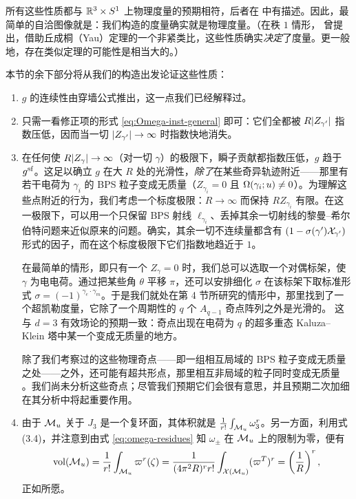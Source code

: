 所有这些性质都与 $\IR^3 \times S^1$ 上物理度量的预期相符，后者在 \cite{Seiberg:1996nz} 中有描述。因此，最简单的自洽图像就是：我们构造的度量确实就是物理度量。（在秩 $1$ 情形，\cite{Seiberg:1996nz} 曾提出，借助丘成桐（Yau）定理的一个非紧类比，这些性质确实\emph{决定}了度量。更一般地，存在类似定理的可能性是相当大的。）

本节的余下部分将从我们的构造出发论证这些性质：
\begin{enumerate}
\item $g$ 的连续性由穿墙公式推出，这一点我们已经解释过。

\item 只需一看修正项的形式 \eqref{eq:Omega-inst-general} 即可：它们全都被 $R \abs{Z_{\gamma'}}$ 指数压低，因而当一切 $\abs{Z_{\gamma'}} \to \infty$ 时指数快地消失。

\item 在任何使 $R \abs{Z_\gamma} \to \infty$（对一切 $\gamma$）的极限下，瞬子贡献都指数压低，$g$ 趋于 $g^\sf$。这足以确立 $g$ 在大 $R$ 处的光滑性，\emph{除了}在某些奇异轨迹附近——那里有若干电荷为 $\gamma_i$ 的 BPS 粒子变成无质量（$Z_{\gamma_i} = 0$ 且 $\degen(\gamma_i;u) \neq 0$）。为理解这些点附近的行为，我们考虑一个标度极限：$R \to \infty$ 而保持 $R Z_{\gamma_i}$ 有限。在这一极限下，可以用一个只保留 BPS 射线 $\ell_{\gamma_i}$、丢掉其余一切射线的黎曼--希尔伯特问题来近似原来的问题。确实，其余一切不连续量都含有 $(1-\sigma(\gamma')\CX_{\gamma'})$ 形式的因子，而在这个标度极限下它们指数地趋近于 $1$。

在最简单的情形，即只有一个 $Z_\gamma = 0$ 时，我们总可以选取一个对偶标架，使 $\gamma$ 为电电荷。通过把某些角 $\theta$ 平移 $\pi$，还可以安排细化 $\sigma$ 在该标架下取标准形式 $\sigma = (-1)^{\gamma_e \cdot \gamma_m}$。于是我们就处在第 4 节所研究的情形中，那里找到了一个超凯勒度量，它除了一个周期性的 $q$ 个 $A_{q-1}$ 奇点阵列之外是光滑的。%
这与 $d=3$ 有效场论的预期一致：奇点出现在电荷为 $q$ 的超多重态 Kaluza--Klein 塔中某一个变成无质量的地方。

除了我们考察过的这些物理奇点——即一组相互局域的 BPS 粒子变成无质量之处——之外，还可能有超共形点，那里相互非局域的粒子同时变成无质量 \cite{Argyres:1995jj,Argyres:1995xn}。我们尚未分析这些奇点；尽管我们预期它们会很有意思，并且预期二次加细在其分析中将起重要作用。

\item 由于 $\CM_u$ 关于 $J_3$ 是一个复环面，其体积就是 $\frac{1}{r!} \int_{\CM_u} \omega_3^r$。另一方面，利用式 (3.4)，并注意到由式 \eqref{eq:omega-residues} 知 $\omega_{\pm}$ 在 $\CM_u$ 上的限制为零，便有%
\begin{equation}
\vol(\CM_u) = \frac{1}{r!} \int_{\CM_u} \hsymp^r(\zeta) = \frac{1}{(4 \pi^2 R)^r r!} \int_{\CX(\CM_u)} (\hsymp^T)^r = \left(\frac{1}{R}\right)^r,
\end{equation}
正如所愿。


\end{enumerate}
